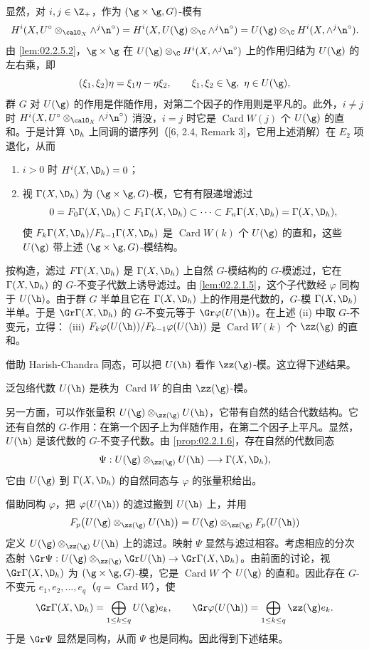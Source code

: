 显然，对 $i,j\in\Z_+$，作为 $(\g\times\g,G)$-模有
\[
H^i(X,U^\circ\otimes_{\calO_X}\wedge^j\n^\circ)=H^i(X,U(\g)\otimes_\C\wedge^j\n^\circ)
=U(\g)\otimes_\C H^i(X,\wedge^j\n^\circ).
\]
由 \ref{lem:02.2.5.2}，$\g\times\g$ 在 $U(\g)\otimes_\C H^i(X,\wedge^j\n^\circ)$ 上的作用归结为 $U(\g)$ 的左右乘，即
\[
(\xi_1,\xi_2)\eta=\xi_1\eta-\eta\xi_2,\qquad \xi_1,\xi_2\in\g,\ \eta\in U(\g),
\]
群 $G$ 对 $U(\g)$ 的作用是伴随作用，对第二个因子的作用则是平凡的。此外，$i\neq j$ 时 $H^i(X,U^\circ\otimes_{\calO_X}\wedge^j\n^\circ)$ 消没，$i=j$ 时它是 $\operatorname{Card}W(j)$ 个 $U(\g)$ 的直和。于是计算 $\D_h$ 上同调的谱序列（[6, 2.4, Remark 3]，它用上述消解）在 $E_2$ 项退化，从而
\begin{enumerate}[label=(\roman*)]
  \item $i>0$ 时 $H^i(X,\D_h)=0$；
  \item 视 $\Gamma(X,\D_h)$ 为 $(\g\times\g,G)$-模，它有有限递增滤过
\[
0=F_0\Gamma(X,\D_h)\subset F_1\Gamma(X,\D_h)\subset\cdots\subset F_n\Gamma(X,\D_h)=\Gamma(X,\D_h),
\]
使 $F_k\Gamma(X,\D_h)/F_{k-1}\Gamma(X,\D_h)$ 是 $\operatorname{Card}W(k)$ 个 $U(\g)$ 的直和，这些 $U(\g)$ 带上述 $(\g\times\g,G)$-模结构。
\end{enumerate}

按构造，滤过 $F\Gamma(X,\D_h)$ 是 $\Gamma(X,\D_h)$ 上自然 $G$-模结构的 $G$-模滤过，它在 $\Gamma(X,\D_h)$ 的 $G$-不变子代数上诱导滤过。由 \ref{lem:02.2.1.5}，这个子代数经 $\varphi$ 同构于 $U(\h)$。由于群 $G$ 半单且它在 $\Gamma(X,\D_h)$ 上的作用是代数的，$G$-模 $\Gamma(X,\D_h)$ 半单。于是 $\Gr\Gamma(X,\D_h)$ 的 $G$-不变元等于 $\Gr\varphi(U(\h))$。在上述 (ii) 中取 $G$-不变元，立得：
(iii) $F_k\varphi(U(\h))/F_{k-1}\varphi(U(\h))$ 是 $\operatorname{Card}W(k)$ 个 $\zz(\g)$ 的直和。

借助 Harish-Chandra 同态，可以把 $U(\h)$ 看作 $\zz(\g)$-模。这立得下述结果。

\begin{lemma}\label{lem:02.2.6.4}
泛包络代数 $U(\h)$ 是秩为 $\operatorname{Card}W$ 的自由 $\zz(\g)$-模。
\end{lemma}

另一方面，可以作张量积 $U(\g)\otimes_{\zz(\g)}U(\h)$，它带有自然的结合代数结构。它还有自然的 $G$-作用：在第一个因子上为伴随作用，在第二个因子上平凡。显然，$U(\h)$ 是该代数的 $G$-不变子代数。由 \ref{prop:02.2.1.6}，存在自然的代数同态
\[
\Psi:U(\g)\otimes_{\zz(\g)}U(\h)\longrightarrow\Gamma(X,\D_h),
\]
它由 $U(\g)$ 到 $\Gamma(X,\D_h)$ 的自然同态与 $\varphi$ 的张量积给出。

借助同构 $\varphi$，把 $\varphi(U(\h))$ 的滤过搬到 $U(\h)$ 上，并用
\[
F_p\bigl(U(\g)\otimes_{\zz(\g)}U(\h)\bigr)=U(\g)\otimes_{\zz(\g)}F_p(U(\h))
\]
定义 $U(\g)\otimes_{\zz(\g)}U(\h)$ 上的滤过。映射 $\Psi$ 显然与滤过相容。考虑相应的分次态射 $\Gr\Psi:U(\g)\otimes_{\zz(\g)}\Gr U(\h)\to\Gr\Gamma(X,\D_h)$。由前面的讨论，视 $\Gr\Gamma(X,\D_h)$ 为 $(\g\times\g,G)$-模，它是 $\operatorname{Card}W$ 个 $U(\g)$ 的直和。因此存在 $G$-不变元 $e_1,e_2,\dots,e_q$（$q=\operatorname{Card}W$），使
\[
\Gr\Gamma(X,\D_h)=\bigoplus_{1\le k\le q}U(\g)e_k,\qquad
\Gr\varphi(U(\h))=\bigoplus_{1\le k\le q}\zz(\g)e_k .
\]
于是 $\Gr\Psi$ 显然是同构，从而 $\Psi$ 也是同构。因此得到下述结果。

